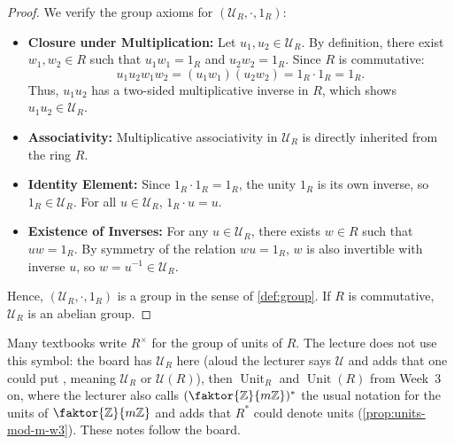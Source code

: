 \begin{content}

\begin{proof}
We verify the group axioms for $(\mathcal{U}_R, \cdot, 1_R)$:
\begin{itemize}
    \item \textbf{Closure under Multiplication:} Let $u_1, u_2 \in \mathcal{U}_R$. By definition, there exist $w_1, w_2 \in R$ such that $u_1 w_1 = 1_R$ and $u_2 w_2 = 1_R$. Since $R$ is commutative:
    \[
    u_1 u_2 w_1 w_2 = (u_1 w_1)(u_2 w_2) = 1_R \cdot 1_R = 1_R.
    \]
    Thus, $u_1 u_2$ has a two-sided multiplicative inverse in $R$, which shows $u_1 u_2 \in \mathcal{U}_R$.
    \item \textbf{Associativity:} Multiplicative associativity in $\mathcal{U}_R$ is directly inherited from the ring $R$.
    \item \textbf{Identity Element:} Since $1_R \cdot 1_R = 1_R$, the unity $1_R$ is its own inverse, so $1_R \in \mathcal{U}_R$. For all $u \in \mathcal{U}_R$, $1_R \cdot u = u$.
    \item \textbf{Existence of Inverses:} For any $u \in \mathcal{U}_R$, there exists $w \in R$ such that $u w = 1_R$. By symmetry of the relation $w u = 1_R$, $w$ is also invertible with inverse $u$, so $w = u^{-1} \in \mathcal{U}_R$.
\end{itemize}
Hence, $(\mathcal{U}_R, \cdot, 1_R)$ is a group in the sense of \cref{def:group}. If $R$ is commutative, $\mathcal{U}_R$ is an abelian group.
\end{proof}
\end{content}

\begin{aiNote}
Many textbooks write $R^\times$ for the group of units of $R$. The lecture does not use this symbol: the board has $\mathcal{U}_R$ here (aloud the lecturer says $\mathcal{U}$ and adds that one could put , meaning $\mathcal{U}_R$ or $\mathcal{U}(R)$), then $\operatorname{Unit}_R$ and $\operatorname{Unit}(R)$ from Week~3 on, where the lecturer also calls $(\faktor{\mathbb{Z}}{m\mathbb{Z}})^*$ the usual notation for the units of $\faktor{\mathbb{Z}}{m\mathbb{Z}}$ and adds that $R^*$ could denote units (\cref{prop:units-mod-m-w3}). These notes follow the board.
\end{aiNote}

